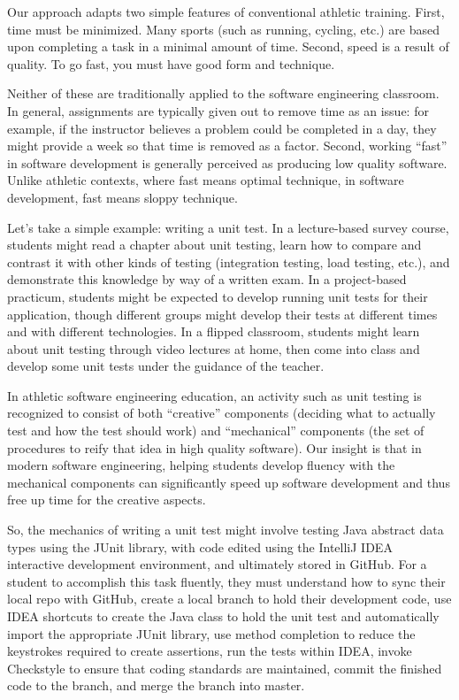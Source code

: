 Our approach adapts two simple features of conventional athletic training. First, time must be minimized.  Many sports (such as running, cycling, etc.) are based upon completing a task in a minimal amount of time.  Second, speed is a result of quality. To go fast, you must have good form and technique. 

Neither of these are traditionally applied to the software engineering classroom. In general, assignments are typically given out to remove time as an issue: for example, if the instructor believes a problem could be completed in a day, they might provide a week so that time is removed as a factor.  Second, working ``fast'' in software development is generally perceived as producing low quality software. Unlike athletic contexts, where fast means optimal technique, in software development, fast means sloppy technique. 

Let's take a simple example: writing a unit test.  In a lecture-based survey course, students might read a chapter about unit testing, learn how to compare and contrast it with other kinds of testing (integration testing, load testing, etc.), and demonstrate this knowledge by way of a written exam.  In a project-based practicum, students might be expected to develop running unit tests for their application, though different groups might develop their tests at different times and with different technologies. In a flipped classroom, students might learn about unit testing through video lectures at home, then come into class and develop some unit tests under the guidance of the teacher. 

In athletic software engineering education, an activity such as unit testing is recognized to consist of both ``creative'' components (deciding what to actually test and how the test should work) and ``mechanical'' components (the set of procedures to reify that idea in high quality software).  Our insight is that in modern software engineering, helping students develop fluency with the mechanical components can significantly speed up software development and thus free up time for the creative aspects. 

So, the mechanics of writing a unit test might involve testing Java abstract data types using the JUnit library, with code edited using the IntelliJ IDEA interactive development environment, and ultimately stored in GitHub. For a student to accomplish this task fluently, they must understand how to sync their local repo with GitHub, create a local branch to hold their development code, use IDEA shortcuts to create the Java class to hold the unit test and automatically import the appropriate JUnit library, use method completion to reduce the keystrokes required to create assertions, run the tests within IDEA, invoke Checkstyle to ensure that coding standards are maintained, commit the finished code to the branch, and merge the branch into master. 










